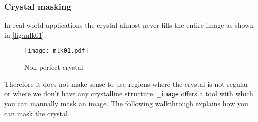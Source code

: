 \subsubsection{Crystal masking}
\label{sec:masking}

In real world applications the crystal almost never fills the entire image as shown in \autoref{fig:mlk01}.

\begin{figure}[H]
	\centering
	\texttt{[image: mlk01.pdf]}
	\caption{Non perfect crystal}
	\label{fig:mlk01}
\end{figure}

Therefore it does not make sense to use regions where the crystal is not regular or where we don't have any crystalline structure. {\twodx}\texttt{\_image} offers a tool with which you can manually mask an image. The following walkthrough explains how you can mask the crystal.


